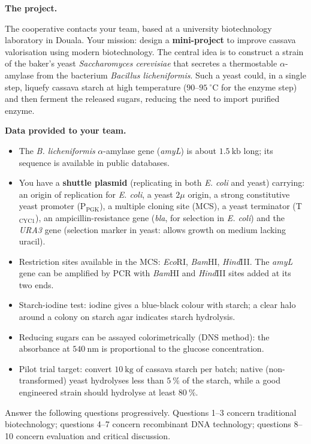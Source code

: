 \documentclass[11pt]{article}
\newcommand{\cle}[1]{{\popxbold\color{popdark}#1}}
\newcounter{popsec}
\newcounter{popsub}
\newcommand{\courssub}[1]{%
  \stepcounter{popsub}%
  \par\vspace{9pt}\noindent{\popxbold\fontsize{11.5}{13}\selectfont\color{popink}{\color{poporange}\thepopsec.\thepopsub}\hspace{6pt}#1}\par\nopagebreak\vspace{4pt}
}
\begin{document}
\textbf{The project.}\par
The cooperative contacts your team, based at a university biotechnology laboratory in Douala. Your mission: design a \textbf{mini-project} to improve cassava valorisation using modern biotechnology. The central idea is to construct a strain of the baker's yeast \emph{Saccharomyces cerevisiae} that secretes a \cle{thermostable $\alpha$-amylase} from the bacterium \emph{Bacillus licheniformis}. Such a yeast could, in a single step, liquefy cassava starch at high temperature ($90$--$95\ ^{\circ}\mathrm{C}$ for the enzyme step) and then ferment the released sugars, reducing the need to import purified enzyme.

\textbf{Data provided to your team.}

\begin{itemize}
\item The \emph{B. licheniformis} $\alpha$-amylase gene (\emph{amyL}) is about $1.5\ \mathrm{kb}$ long; its sequence is available in public databases.
\item You have a \textbf{shuttle plasmid} (replicating in both \emph{E. coli} and yeast) carrying: an origin of replication for \emph{E. coli}, a yeast $2\mu$ origin, a strong constitutive yeast promoter (P$_{\text{PGK}}$), a multiple cloning site (MCS), a yeast terminator (T$_{\text{CYC1}}$), an ampicillin-resistance gene (\emph{bla}, for selection in \emph{E. coli}) and the \emph{URA3} gene (selection marker in yeast: allows growth on medium lacking uracil).
\item Restriction sites available in the MCS: \emph{Eco}RI, \emph{Bam}HI, \emph{Hind}III. The \emph{amyL} gene can be amplified by PCR with \emph{Bam}HI and \emph{Hind}III sites added at its two ends.
\item Starch-iodine test: iodine gives a blue-black colour with starch; a clear halo around a colony on starch agar indicates starch hydrolysis.
\item Reducing sugars can be assayed colorimetrically (DNS method): the absorbance at $540\ \mathrm{nm}$ is proportional to the glucose concentration.
\item Pilot trial target: convert $10\ \mathrm{kg}$ of cassava starch per batch; native (non-transformed) yeast hydrolyses less than $5\ \%$ of the starch, while a good engineered strain should hydrolyse at least $80\ \%$.
\end{itemize}

\courssub{Tasks}

Answer the following questions progressively. Questions 1--3 concern traditional biotechnology; questions 4--7 concern recombinant DNA technology; questions 8--10 concern evaluation and critical discussion.
\end{document}
